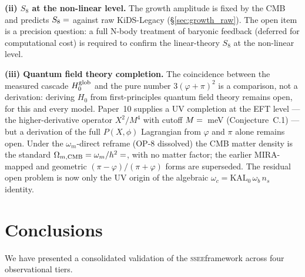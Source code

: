 \documentclass[12pt,a4paper]{article}
\newcommand{\SSEE}{\textsc{ssee}}
\newcommand{\phiG}{\varphi}
\begin{document}
\textbf{(ii) $S_8$ at the non-linear level.}
The growth amplitude is fixed by the CMB and predicts $S_8=\val{S8_leg_pred}$ against
raw KiDS-Legacy (\S\ref{sec:growth_raw}). The open item is a precision
question: a full N-body treatment of baryonic feedback (deferred for
computational cost) is required to confirm the linear-theory $S_8$ at the
non-linear level.

\textbf{(iii) Quantum field theory completion.}
The coincidence between the measured cascade $H_0^{\rm glob}$ and the pure number $3(\phiG+\pi)^2$ is a
comparison, not a derivation: deriving $H_0$ from first-principles quantum field theory remains open, for this and every model.
Paper~10 supplies a UV completion at the EFT level --- the higher-derivative
operator $X^2/M^4$ with cutoff $M = \val{M_meV_d2}$~meV (Conjecture~C.1) --- but a derivation of
the full $P(X,\phi)$ Lagrangian from $\phiG$ and $\pi$ alone remains open.
Under the $\omega_m$-direct reframe (OP-8 dissolved) the CMB matter density is
the standard $\Omega_{m,\mathrm{CMB}} = \omega_m/h^2 = \val{OMEGA_M_TOTAL_d6}$, with no matter
factor; the earlier MIRA-mapped and geometric $(\pi-\phiG)/(\pi+\phiG)$ forms are
superseded. The residual open
problem is now only the UV origin of the algebraic $\omega_c=\mathrm{KAL_0}\,\omega_b\,n_s$
identity.


\section{Conclusions}
\label{sec:conclusions}

We have presented a consolidated validation of the \SSEE framework
across four observational tiers.
\end{document}
